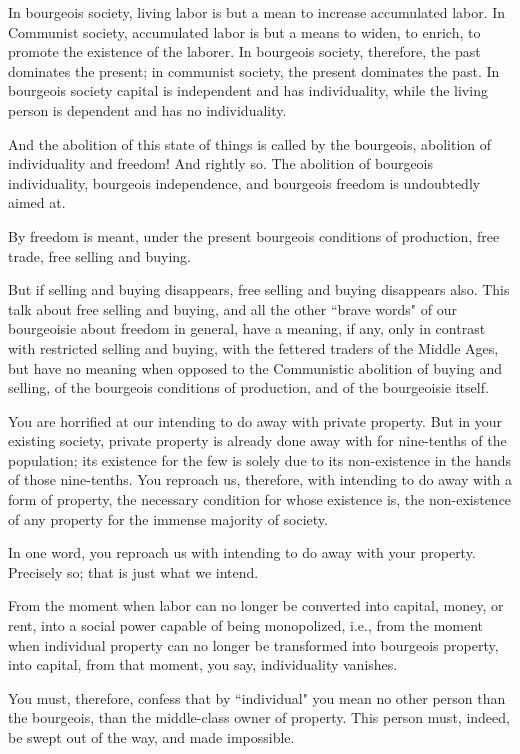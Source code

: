 In bourgeois society, living labor is but a mean to increase accumulated labor. In Communist society, accumulated labor is but a means to widen, to enrich, to promote the existence of the laborer. In bourgeois society, therefore, the past dominates the present; in communist society, the present dominates the past. In bourgeois society capital is independent and has individuality, while the living person is dependent and has no individuality.

And the abolition of this state of things is called by the bourgeois, abolition of individuality and freedom! And rightly so. The abolition of bourgeois individuality, bourgeois independence, and bourgeois freedom is undoubtedly aimed at.

By freedom is meant, under the present bourgeois conditions of production, free trade, free selling and buying.

But if selling and buying disappears, free selling and buying disappears also. This talk about free selling and buying, and all the other ``brave words" of our bourgeoisie about freedom in general, have a meaning, if any, only in contrast with restricted selling and buying, with the fettered traders of the Middle Ages, but have no meaning when opposed to the Communistic abolition of buying and selling, of the bourgeois conditions of production, and of the bourgeoisie itself.

You are horrified at our intending to do away with private property. But in your existing society, private property is already done away with for nine-tenths of the population; its existence for the few is solely due to its non-existence in the hands of those nine-tenths. You reproach us, therefore, with intending to do away with a form of property, the necessary condition for whose existence is, the non-existence of any property for the immense majority of society.

In one word, you reproach us with intending to do away with your property. Precisely so; that is just what we intend.

From the moment when labor can no longer be converted into capital, money, or rent, into a social power capable of being monopolized, i.e., from the moment when individual property can no longer be transformed into bourgeois property, into capital, from that moment, you say, individuality vanishes.

You must, therefore, confess that by ``individual" you mean no other person than the bourgeois, than the middle-class owner of property. This person must, indeed, be swept out of the way, and made impossible.

